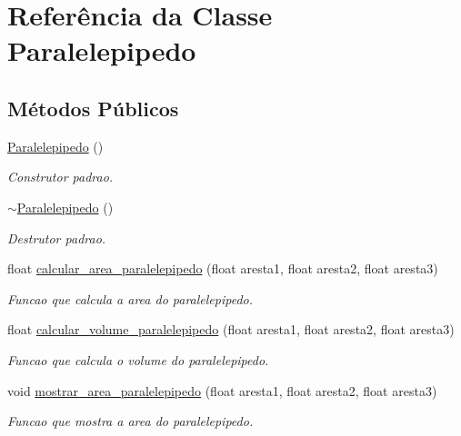 \hypertarget{classParalelepipedo}{}\section{Referência da Classe Paralelepipedo}
\label{classParalelepipedo}
\subsection*{Métodos Públicos}
\begin{DoxyCompactItemize}
\item 
\mbox{\label{classParalelepipedo_a504bdcc729cfcba0b76f834f6493b0a2}} 
\hyperlink{classParalelepipedo_a504bdcc729cfcba0b76f834f6493b0a2}{Paralelepipedo} ()
\begin{DoxyCompactList}\small\item\em Construtor padrao. \end{DoxyCompactList}\item 
\mbox{\label{classParalelepipedo_a844890821adcfdf1bdcaecb7fc2f8a0c}} 
\hyperlink{classParalelepipedo_a844890821adcfdf1bdcaecb7fc2f8a0c}{$\sim$\+Paralelepipedo} ()
\begin{DoxyCompactList}\small\item\em Destrutor padrao. \end{DoxyCompactList}\item 
float \hyperlink{classParalelepipedo_a1715462a8d3456c1d0df0b7a0bd37242}{calcular\+\_\+area\+\_\+paralelepipedo} (float aresta1, float aresta2, float aresta3)
\begin{DoxyCompactList}\small\item\em Funcao que calcula a area do paralelepipedo. \end{DoxyCompactList}\item 
float \hyperlink{classParalelepipedo_ae5be025ecab123eec36e7831025d39c7}{calcular\+\_\+volume\+\_\+paralelepipedo} (float aresta1, float aresta2, float aresta3)
\begin{DoxyCompactList}\small\item\em Funcao que calcula o volume do paralelepipedo. \end{DoxyCompactList}\item 
void \hyperlink{classParalelepipedo_a2dec8c7de5c7780f9896f3ae25b7f680}{mostrar\+\_\+area\+\_\+paralelepipedo} (float aresta1, float aresta2, float aresta3)
\begin{DoxyCompactList}\small\item\em Funcao que mostra a area do paralelepipedo. \end{DoxyCompactList}\item 

\end{DoxyCompactItemize}
